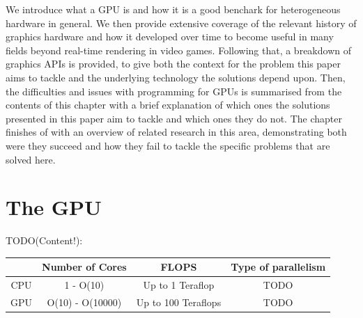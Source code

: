 \documentclass[a4paper,12pt,twoside,openright]{report}
\begin{document}


We introduce what a GPU is and how it is a good benchark for heterogeneous
hardware in general. We then provide extensive coverage of the relevant history
of graphics hardware and how it developed over time to become useful in many
fields beyond real-time rendering in video games. Following that, a breakdown
of graphics APIs is provided, to give both the context for the problem this
paper aims to tackle and the underlying technology the solutions depend upon.
Then, the difficulties and issues with programming for GPUs is summarised from
the contents of this chapter with a brief explanation of which ones the
solutions presented in this paper aim to tackle and which ones they do not. The
chapter finishes of with an overview of related research in this area,
demonstrating both were they succeed and how they fail to tackle the specific
problems that are solved here.


\section{The GPU}

\label{sec:gpu_hardware}

TODO(Content!):

\begin{center}
\begin{tabular}{||c||c|c|c||}
\hline
        & Number of Cores  & FLOPS                                         & Type of parallelism \\
\hline
\hline
CPU     & 1 - O(10)        & Up to 1 Teraflop \cite{IntelTeraFlop}         & TODO                \\
\hline
GPU     & O(10) - O(10000) & Up to 100 Teraflops \cite{NVIDIA100TeraFlops} & TODO                \\
\hline
\end{tabular}
\end{center}
\end{document}
